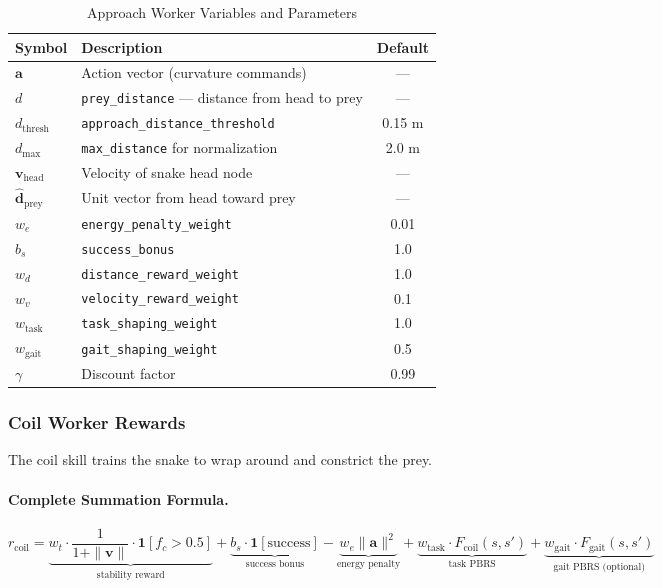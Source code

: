 \documentclass[11pt]{article}
\begin{document}
\begin{table}[H]
\centering
\caption{Approach Worker Variables and Parameters}
\begin{tabular}{@{}llc@{}}
\toprule
\textbf{Symbol} & \textbf{Description} & \textbf{Default} \\
\midrule
$\mathbf{a}$ & Action vector (curvature commands) & --- \\
$d$ & \texttt{prey\_distance} --- distance from head to prey & --- \\
$d_{\text{thresh}}$ & \texttt{approach\_distance\_threshold} & 0.15 m \\
$d_{\max}$ & \texttt{max\_distance} for normalization & 2.0 m \\
$\mathbf{v}_{\text{head}}$ & Velocity of snake head node & --- \\
$\hat{\mathbf{d}}_{\text{prey}}$ & Unit vector from head toward prey & --- \\
$w_e$ & \texttt{energy\_penalty\_weight} & 0.01 \\
$b_s$ & \texttt{success\_bonus} & 1.0 \\
$w_d$ & \texttt{distance\_reward\_weight} & 1.0 \\
$w_v$ & \texttt{velocity\_reward\_weight} & 0.1 \\
$w_{\text{task}}$ & \texttt{task\_shaping\_weight} & 1.0 \\
$w_{\text{gait}}$ & \texttt{gait\_shaping\_weight} & 0.5 \\
$\gamma$ & Discount factor & 0.99 \\
\bottomrule
\end{tabular}
\end{table}

\subsubsection{Coil Worker Rewards}

The coil skill trains the snake to wrap around and constrict the prey.

\paragraph{Complete Summation Formula.}
\begin{equation}
    r_{\text{coil}} = \underbrace{w_t \cdot \frac{1}{1 + \|\mathbf{v}\|} \cdot \mathbf{1}[f_c > 0.5]}_{\text{stability reward}}
    + \underbrace{b_s \cdot \mathbf{1}[\text{success}]}_{\text{success bonus}}
    - \underbrace{w_e \|\mathbf{a}\|^2}_{\text{energy penalty}}
    + \underbrace{w_{\text{task}} \cdot F_{\text{coil}}(s, s')}_{\text{task PBRS}}
    + \underbrace{w_{\text{gait}} \cdot F_{\text{gait}}(s, s')}_{\text{gait PBRS (optional)}}
\end{equation}
\end{document}
